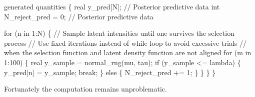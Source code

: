 \documentclass[
  letterpaper,
  DIV=11,
  numbers=noendperiod]{scrartcl}
\newenvironment{Shaded}{\begin{snugshade}}{\end{snugshade}}
\newcommand{\AttributeTok}[1]{\textcolor[rgb]{0.40,0.45,0.13}{#1}}
\newcommand{\CommentTok}[1]{\textcolor[rgb]{0.37,0.37,0.37}{#1}}
\newcommand{\ControlFlowTok}[1]{\textcolor[rgb]{0.00,0.23,0.31}{#1}}
\newcommand{\DataTypeTok}[1]{\textcolor[rgb]{0.68,0.00,0.00}{#1}}
\newcommand{\DecValTok}[1]{\textcolor[rgb]{0.68,0.00,0.00}{#1}}
\newcommand{\FunctionTok}[1]{\textcolor[rgb]{0.28,0.35,0.67}{#1}}
\newcommand{\KeywordTok}[1]{\textcolor[rgb]{0.00,0.23,0.31}{#1}}
\newcommand{\NormalTok}[1]{\textcolor[rgb]{0.00,0.23,0.31}{#1}}
\newcommand{\OtherTok}[1]{\textcolor[rgb]{0.00,0.23,0.31}{#1}}
\newcommand{\SpecialCharTok}[1]{\textcolor[rgb]{0.37,0.37,0.37}{#1}}
\newcommand{\StringTok}[1]{\textcolor[rgb]{0.13,0.47,0.30}{#1}}
\begin{document}
\begin{codelisting}
\begin{Shaded}
\begin{Highlighting}[]
\KeywordTok{generated quantities}\NormalTok{ \{}
  \DataTypeTok{real}\NormalTok{ y\_pred[N];        }\CommentTok{// Posterior predictive data}
  \DataTypeTok{int}\NormalTok{ N\_reject\_pred = }\DecValTok{0}\NormalTok{; }\CommentTok{// Posterior predictive data}

  \ControlFlowTok{for}\NormalTok{ (n }\ControlFlowTok{in} \DecValTok{1}\NormalTok{:N) \{}
    \CommentTok{// Sample latent intensities until one survives the selection process}
    \CommentTok{// Use fixed iterations instead of while loop to avoid excessive trials}
    \CommentTok{// when the selection function and latent density function are not aligned}
    \ControlFlowTok{for}\NormalTok{ (m }\ControlFlowTok{in} \DecValTok{1}\NormalTok{:}\DecValTok{100}\NormalTok{) \{}
      \DataTypeTok{real}\NormalTok{ y\_sample = normal\_rng(mu, tau);}
      \ControlFlowTok{if}\NormalTok{ (y\_sample \textless{}= lambda) \{ }
\NormalTok{        y\_pred[n] = y\_sample;}
        \ControlFlowTok{break}\NormalTok{;}
\NormalTok{      \} }\ControlFlowTok{else}\NormalTok{ \{}
\NormalTok{        N\_reject\_pred += }\DecValTok{1}\NormalTok{;}
\NormalTok{      \}}
\NormalTok{    \}}
\NormalTok{  \} }
\NormalTok{\}}
\end{Highlighting}
\end{Shaded}

\end{codelisting}

\begin{Shaded}
\end{Shaded}

Fortunately the computation remains unproblematic.

\begin{Shaded}
\end{Shaded}
\end{document}
